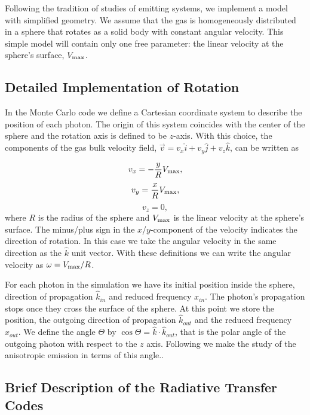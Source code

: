 \documentclass{emulateapj}
\newcommand{\ly}{{\ifmmode{{\rm Ly}\alpha~}\else{Ly$\alpha$~}\fi}}
\begin{document}
Following the tradition of studies of \ly emitting systems,
we implement a model with simplified geometry. We assume that the gas
is homogeneously distributed in a sphere that rotates as a solid body
with constant angular velocity. This simple model will contain only
one free parameter: the linear velocity at the sphere's surface, $V_{\rm
  max}$. 

\subsection{Detailed Implementation of Rotation}

 In the Monte Carlo code we define a Cartesian coordinate system to
 describe the position of each photon. The origin of this system
 coincides with the center of the sphere and the rotation axis is defined
 to be $z$-axis. With this choice, the components of the gas bulk velocity
 field, $\vec{v} = v_{x}\hat{i} + v_{y}\hat{j} + v_{z}\hat{k}$, can be
 written as  
  
\begin{equation}
    v_{x}=-\frac{y}{R}V_{\rm max}, \label{subeq1}
\end{equation}
\begin{equation}
    v_{y}=\frac{x}{R}V_{\rm max}, \label{subeq2}
\end{equation}
\begin{equation}
    v_{z}=0, \label{subeq3}
\end{equation}
%
where $R$ is the radius of the sphere and $V_{\rm max}$ is the linear
velocity at the sphere's surface. The minus/plus sign in the
$x$/$y$-component of the velocity indicates the direction of
rotation. In this case we take the angular velocity in the same
direction as the $\hat{k}$ unit vector. With these definitions we can
write the angular velocity as $\omega=V_{\rm max}/R$.  

For each photon in the simulation we have its initial position inside
the sphere, direction of propagation $\hat{k}_{in}$ and reduced
frequency $x_{in}$. The photon's propagation stops once they cross the
surface of the sphere. At this point we store the position, the outgoing direction
of propagation $\hat{k}_{out}$ and the reduced frequency $x_{out}$. We
define the angle $\Theta$ by $\cos\Theta = \hat{k}\cdot
\hat{k}_{out}$, that is the polar angle of the outgoing photon with
respect to the $z$ axis. Following \cite{Zheng2013} we make the study
of the anisotropic emission in terms of this angle..


\subsection{Brief Description of the Radiative Transfer Codes}
\end{document}
